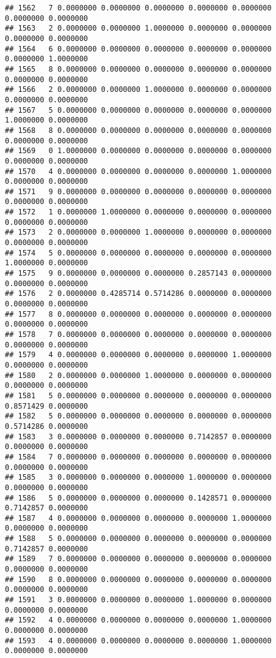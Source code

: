 \documentclass[
]{article}
\begin{document}
\begin{verbatim}
## 1562   7 0.0000000 0.0000000 0.0000000 0.0000000 0.0000000 0.0000000 0.0000000
## 1563   2 0.0000000 0.0000000 1.0000000 0.0000000 0.0000000 0.0000000 0.0000000
## 1564   6 0.0000000 0.0000000 0.0000000 0.0000000 0.0000000 0.0000000 1.0000000
## 1565   8 0.0000000 0.0000000 0.0000000 0.0000000 0.0000000 0.0000000 0.0000000
## 1566   2 0.0000000 0.0000000 1.0000000 0.0000000 0.0000000 0.0000000 0.0000000
## 1567   5 0.0000000 0.0000000 0.0000000 0.0000000 0.0000000 1.0000000 0.0000000
## 1568   8 0.0000000 0.0000000 0.0000000 0.0000000 0.0000000 0.0000000 0.0000000
## 1569   0 1.0000000 0.0000000 0.0000000 0.0000000 0.0000000 0.0000000 0.0000000
## 1570   4 0.0000000 0.0000000 0.0000000 0.0000000 1.0000000 0.0000000 0.0000000
## 1571   9 0.0000000 0.0000000 0.0000000 0.0000000 0.0000000 0.0000000 0.0000000
## 1572   1 0.0000000 1.0000000 0.0000000 0.0000000 0.0000000 0.0000000 0.0000000
## 1573   2 0.0000000 0.0000000 1.0000000 0.0000000 0.0000000 0.0000000 0.0000000
## 1574   5 0.0000000 0.0000000 0.0000000 0.0000000 0.0000000 1.0000000 0.0000000
## 1575   9 0.0000000 0.0000000 0.0000000 0.2857143 0.0000000 0.0000000 0.0000000
## 1576   2 0.0000000 0.4285714 0.5714286 0.0000000 0.0000000 0.0000000 0.0000000
## 1577   8 0.0000000 0.0000000 0.0000000 0.0000000 0.0000000 0.0000000 0.0000000
## 1578   7 0.0000000 0.0000000 0.0000000 0.0000000 0.0000000 0.0000000 0.0000000
## 1579   4 0.0000000 0.0000000 0.0000000 0.0000000 1.0000000 0.0000000 0.0000000
## 1580   2 0.0000000 0.0000000 1.0000000 0.0000000 0.0000000 0.0000000 0.0000000
## 1581   5 0.0000000 0.0000000 0.0000000 0.0000000 0.0000000 0.8571429 0.0000000
## 1582   5 0.0000000 0.0000000 0.0000000 0.0000000 0.0000000 0.5714286 0.0000000
## 1583   3 0.0000000 0.0000000 0.0000000 0.7142857 0.0000000 0.0000000 0.0000000
## 1584   7 0.0000000 0.0000000 0.0000000 0.0000000 0.0000000 0.0000000 0.0000000
## 1585   3 0.0000000 0.0000000 0.0000000 1.0000000 0.0000000 0.0000000 0.0000000
## 1586   5 0.0000000 0.0000000 0.0000000 0.1428571 0.0000000 0.7142857 0.0000000
## 1587   4 0.0000000 0.0000000 0.0000000 0.0000000 1.0000000 0.0000000 0.0000000
## 1588   5 0.0000000 0.0000000 0.0000000 0.0000000 0.0000000 0.7142857 0.0000000
## 1589   7 0.0000000 0.0000000 0.0000000 0.0000000 0.0000000 0.0000000 0.0000000
## 1590   8 0.0000000 0.0000000 0.0000000 0.0000000 0.0000000 0.0000000 0.0000000
## 1591   3 0.0000000 0.0000000 0.0000000 1.0000000 0.0000000 0.0000000 0.0000000
## 1592   4 0.0000000 0.0000000 0.0000000 0.0000000 1.0000000 0.0000000 0.0000000
## 1593   4 0.0000000 0.0000000 0.0000000 0.0000000 1.0000000 0.0000000 0.0000000

\end{verbatim}
\end{document}
